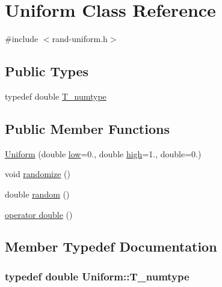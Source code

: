 \hypertarget{classUniform}{}\section{Uniform Class Reference}
\label{classUniform}


{\ttfamily \#include $<$rand-\/uniform.\+h$>$}

\subsection*{Public Types}
\begin{DoxyCompactItemize}
\item 
typedef double \hyperlink{classUniform_a45352b9abc8c1dd5bf3fe5c1e7a4a1e0}{T\+\_\+numtype}
\end{DoxyCompactItemize}
\subsection*{Public Member Functions}
\begin{DoxyCompactItemize}
\item 
\hyperlink{classUniform_a38d47d87f5553f47a43fb33e77e8e8e5}{Uniform} (double \hyperlink{constants_8h_a2f13f92cd23d69a695f629d173e191b7}{low}=0., double \hyperlink{constants_8h_ae74c9011680d5f172ff82efa9c482283}{high}=1., double=0.)
\item 
void \hyperlink{classUniform_af1d24c32f52cbef00cd59f56ad51dcfc}{randomize} ()
\item 
double \hyperlink{classUniform_a47f3a4538e8be7e1bc73dc8f2a40a6aa}{random} ()
\item 
\hyperlink{classUniform_aebee11b1c0b13ef3224950225e0d9feb}{operator double} ()
\end{DoxyCompactItemize}


\subsection{Member Typedef Documentation}
\hypertarget{classUniform_a45352b9abc8c1dd5bf3fe5c1e7a4a1e0}{}
\subsubsection[{T\+\_\+numtype}]{\setlength{\rightskip}{0pt plus 5cm}typedef double {\bf Uniform\+::\+T\+\_\+numtype}}\label{classUniform_a45352b9abc8c1dd5bf3fe5c1e7a4a1e0}



